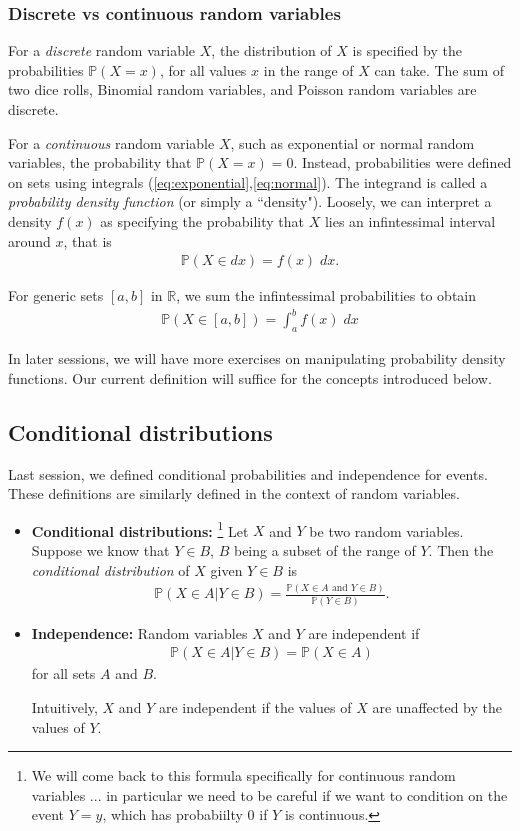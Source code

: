 \documentclass[11pt]{article}
\theoremstyle{definition}
\renewcommand{\P}{\mathbb{P}}
\newcommand{\R}{\mathbb{R}}
\begin{document}
\subsubsection*{Discrete vs continuous random variables}

For a \textit{discrete} random variable $X$, the distribution of $X$ is specified
by the probabilities $\P(X = x)$, for all values $x$ in the range of $X$
can take. The sum of two dice rolls, Binomial random variables, and Poisson random variables
are discrete.

For a \textit{continuous} random variable $X$, such as exponential or normal random variables,
the probability that $\P(X = x) = 0$. Instead, probabilities were defined on sets
using integrals (\ref{eq:exponential},\ref{eq:normal}).
The integrand is called a \textit{probability density function} (or simply a ``density"). Loosely,
we can interpret a density $f(x)$ as specifying the probability that $X$ lies
an infintessimal interval around $x$, that is
\begin{align*}
  \P(X \in dx) = f(x)\;dx.
\end{align*}

For generic sets $[a, b]$ in $\R$, we sum the infintessimal probabilities
to obtain
\begin{align*}
  \P(X\in[a, b]) = \int_a^b f(x)\;dx
\end{align*}

In later sessions, we will have more exercises on manipulating probability density functions.
Our current definition will suffice for the concepts introduced below.

\subsection{Conditional distributions}
Last session, we defined conditional probabilities and independence for events.
These definitions are similarly defined in the context of random variables.
\begin{itemize}
  \item {\bf Conditional distributions: }\footnote{
  We will come back to this formula specifically for continuous random variables ...
  in particular we need to be careful if we want to condition on the event $Y = y$,
  which has probabiilty 0 if $Y$ is continuous.
  }
  Let $X$ and $Y$ be two random variables. Suppose we know that $Y\in B$, $B$
  being a subset of the range of $Y$. Then the
  \textit{conditional distribution} of $X$ given $Y\in B$ is
  \begin{align*}
    \P(X\in A | Y \in B) = \frac{\P(X\in A \text{ and } Y \in B)}{\P(Y \in B)}.
  \end{align*}
  \item {\bf Independence: } Random variables $X$ and $Y$ are independent if
  \begin{align*}
    \P(X\in A | Y \in B) = \P(X\in A)
  \end{align*}
  for all sets $A$ and $B$.

  Intuitively, $X$ and $Y$ are independent if the values of $X$ are unaffected
  by the values of $Y$.
\end{itemize}
\end{document}
